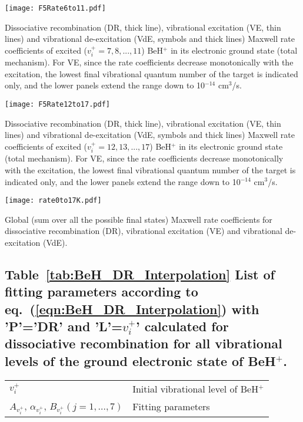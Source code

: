 \documentclass[reviewcopy]{elsarticle}
\begin{document}
\clearpage

 \begin{Dfigures}[h]%
\texttt{[image: F5Rate6to11.pdf]}
\caption{\label{fig:6} 
Dissociative recombination (DR, thick line), vibrational excitation (VE, thin lines) and vibrational de-excitation (VdE, symbols and thick lines) Maxwell rate coefficients of excited ($v_{i}^{+}=7,8,...,11$) {\rm BeH$^{+}$} in its electronic ground state (total mechanism). For VE, since the rate coefficients decrease monotonically with the excitation, the lowest final vibrational quantum number of the target is indicated only, and the lower panels extend the range down to \rm{10$^{-14}$ cm$^3$/s}.}
\end{Dfigures}

\clearpage

 \begin{Dfigures}[h]%
\texttt{[image: F5Rate12to17.pdf]}
\caption{\label{fig:7} 
Dissociative recombination (DR, thick line), vibrational excitation (VE, thin lines) and vibrational de-excitation (VdE, symbols and thick lines) Maxwell rate coefficients of excited ($v_{i}^{+}=12,13,...,17$) {\rm BeH$^{+}$} in its electronic ground state (total mechanism). For VE, since the rate coefficients decrease monotonically with the excitation, the lowest final vibrational quantum number of the target is indicated only, and the lower panels extend the range down to \rm{10$^{-14}$ cm$^3$/s}.}
\end{Dfigures}

\clearpage

 \begin{Dfigures}[h]%
\texttt{[image: rate0to17K.pdf]}
\caption{\label{fig:8} 
Global (sum over all the possible final states) Maxwell rate coefficients for dissociative recombination (DR), vibrational excitation (VE) and vibrational de-excitation (VdE).} 
\end{Dfigures}

\clearpage

\TableExplanation

\subsection*{Table~\ref{tab:BeH_DR_Interpolation} List of fitting parameters according to eq.~(\ref{eqn:BeH_DR_Interpolation}) with 'P'='DR' and 'L'=$v_i^+$' calculated for dissociative recombination for all vibrational levels of the ground electronic state of BeH$^+$.}
\begin{tabular}{@{}p{2.5in}p{6in}@{}}
$v_i^+$		& Initial vibrational level of BeH$^+$ \\
$A_{v^+_i}$, $\alpha_{v^+_i}$, $B_{v^+_i}(j=1,\dots,7)$	& Fitting parameters \\
\end{tabular}
\end{document}
